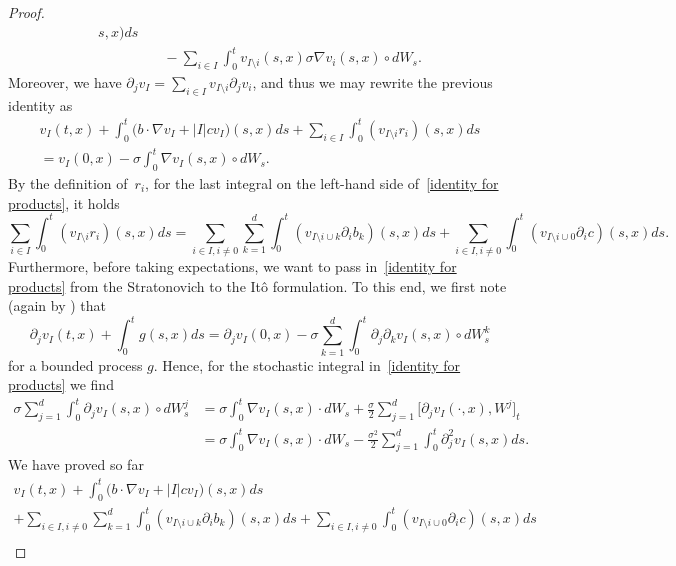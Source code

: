 \documentclass[a4paper,10pt]{article}
\newcommand\1{\mathbbm{1}}
\numberwithin{equation}{section}
\begin{document}
\begin{proof}
\begin{align*}
s,x)  ds\\
& \quad {} -\sum_{i\in I}\int_{0}^{t}v_{I\setminus i}(s,x)  \sigma\nabla
v_{i}(s,x)  \circ dW_{s} .
\end{align*}
Moreover, we have $\partial_{j}v_{I}=\sum_{i\in I}v_{I\setminus i}\partial_{j}v_{i}$,
and thus we may rewrite the previous identity as
\begin{multline}
 v_{I}(t,x)  +\int_{0}^{t} \big(b\cdot\nabla v_{I}+\left\vert
I\right\vert cv_{I}\big)  (s,x)  ds+\sum_{i\in I}\int_{0} 
^{t}(v_{I\setminus i}r_{i})  (s,x)
ds\label{identity for products}\\
 =v_{I}(0,x)  -\sigma\int_{0}^{t}\nabla v_{I}(
s,x)  \circ dW_{s} .
\end{multline}
By the definition of~$r_i$, for the last integral on the left-hand side of~\eqref{identity for products}, it holds
\begin{equation*}
\sum_{i\in I}\int_{0}^{t}(v_{I\setminus i}r_{i})  (
s,x)  ds=\sum_{i\in I,i\neq0}\sum_{k=1}^{d}\int_{0}^{t}(
v_{I\setminus i\cup k}\partial_{i}b_{k})  (s,x)
ds+\sum_{i\in I,i\neq0}\int_{0}^{t}(v_{I\setminus i\cup0}\partial
_{i}c)  (s,x)  ds .
\end{equation*}
Furthermore, before taking expectations, we want to pass in~\eqref{identity for products} from the Stratonovich to the It\^o formulation. To this end, we first note
(again by \cite[Theorem 7.10]{KUNITA84}) that
\[
\partial_{j}v_{I}(t,x)  +\int_{0}^{t}g(s,x)
ds=\partial_{j}v_{I}(0,x)  -\sigma\sum_{k=1}^{d}\int_{0} 
^{t}\partial_{j}\partial_{k}v_{I}(s,x)  \circ dW_{s}^{k} 
\]
for a bounded process $g$. Hence, for the stochastic integral in~\eqref{identity for products} we find
\begin{align*}
\sigma\sum_{j=1}^{d}\int_{0}^{t}\partial_{j}v_{I}(s,x)  \circ
dW_{s}^{j}  &  =\sigma\int_{0}^{t}\nabla v_{I}(s,x)  \cdot
dW_{s}+\frac{\sigma}{2}\sum_{j=1}^{d}\big[  \partial_{j}v_{I}(
\cdot,x)  ,W^{j}\big]_{t}\\
&  =\sigma\int_{0}^{t}\nabla v_{I}(s,x)  \cdot dW_{s} 
-\frac{\sigma^{2}}{2}\sum_{j=1}^{d}\int_{0}^{t}\partial_{j}^{2}v_{I}(
s,x)  ds .
\end{align*}
We have proved so far
\begin{multline*}
v_{I}(t,x)  +\int_{0}^{t} \big(b\cdot\nabla v_{I}+\left\vert
I\right\vert cv_{I}\big)  (s,x)  ds\\
 +\sum_{i\in I,i\neq0}\sum_{k=1}^{d}\int_{0}^{t}(v_{I\setminus i\cup
k}\partial_{i}b_{k})  (s,x)  ds+ \sum_{i\in I,i\neq0} 
\int_{0}^{t}(v_{I\setminus i\cup0}\partial_{i}c)  (
s,x)  ds\\

\end{multline*}
\end{proof}
\end{document}
